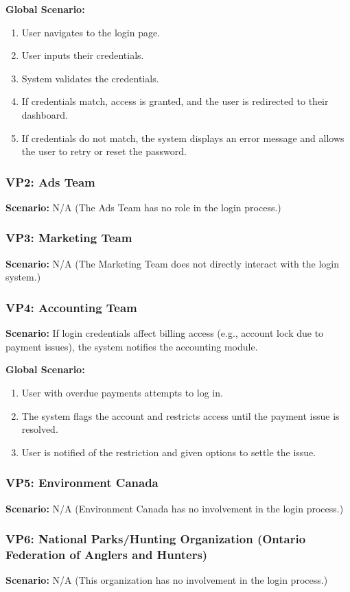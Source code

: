 \documentclass[]{article}
\begin{document}
\begin{enumerate}[{\bf BE1.}]
\textbf{Global Scenario:}
\begin{enumerate}
    \item User navigates to the login page.
    \item User inputs their credentials.
    \item System validates the credentials.
    \item If credentials match, access is granted, and the user is redirected to their dashboard.
    \item If credentials do not match, the system displays an error message and allows the user to retry or reset the password.
\end{enumerate}

\subsubsection*{VP2: Ads Team}
\textbf{Scenario:} N/A (The Ads Team has no role in the login process.)

\subsubsection*{VP3: Marketing Team}
\textbf{Scenario:} N/A (The Marketing Team does not directly interact with the login system.)

\subsubsection*{VP4: Accounting Team}
\textbf{Scenario:} If login credentials affect billing access (e.g., account lock due to payment issues), the system notifies the accounting module.

\textbf{Global Scenario:}
\begin{enumerate}
    \item User with overdue payments attempts to log in.
    \item The system flags the account and restricts access until the payment issue is resolved.
    \item User is notified of the restriction and given options to settle the issue.
\end{enumerate}

\subsubsection*{VP5: Environment Canada}
\textbf{Scenario:} N/A (Environment Canada has no involvement in the login process.)

\subsubsection*{VP6: National Parks/Hunting Organization (Ontario Federation of Anglers and Hunters)}
\textbf{Scenario:} N/A (This organization has no involvement in the login process.)

\end{enumerate}
\end{document}
